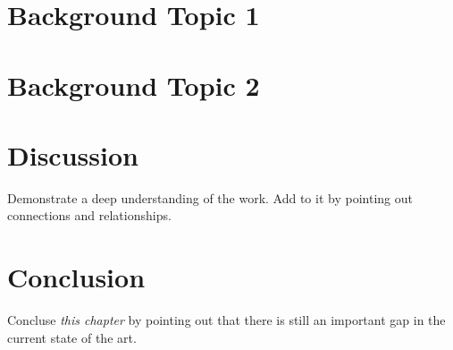 \section{Background Topic 1}

\section{Background Topic 2}

\section{Discussion}

Demonstrate a deep understanding of the work. Add to it by pointing out connections and relationships.

\section{Conclusion}
Concluse \textit{this chapter} by pointing out that there is still an important gap in the current state of the art.